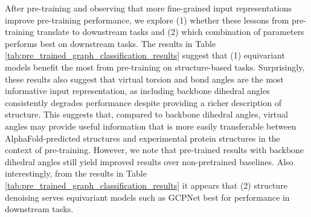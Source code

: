 After pre-training and observing that more fine-grained input representations improve pre-training performance, we explore (1) whether these lessons from pre-training translate to downstream tasks and (2) which combination of parameters performs best on downstream tasks. The results in Table \ref{tab:pre_trained_graph_classification_results} suggest that (1) equivariant models benefit the most from pre-training on structure-based tasks. Surprisingly, these results also suggest that virtual torsion and bond angles are the most informative input representation, as including backbone dihedral angles consistently degrades performance despite providing a richer description of structure. This suggests that, compared to backbone dihedral angles, virtual angles may provide useful information that is more easily transferable between AlphaFold-predicted structures and experimental protein structures in the context of pre-training. However, we note that pre-trained results with backbone dihedral angles still yield improved results over non-pretrained baselines. Also interestingly, from the results in Table \ref{tab:pre_trained_graph_classification_results} it appears that (2) structure denoising serves equivariant models such as GCPNet best for performance in downstream tasks.
